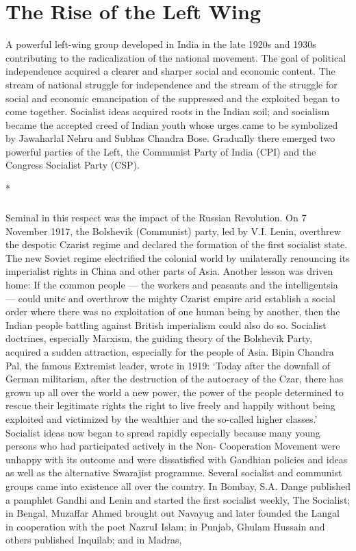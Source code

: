 \cleardoublepage
\chapter{The Rise of the Left Wing}



A powerful left-wing group developed in India in the late 1920s and 1930s contributing to the radicalization of the national movement. The goal of political independence acquired a clearer and sharper social and economic content. The stream of national struggle for independence and the stream of the struggle for social and economic emancipation of the suppressed and the exploited began to come together. Socialist ideas acquired roots in the Indian soil; and socialism became the accepted creed of Indian youth whose urges came to be symbolized by Jawaharlal Nehru and Subhas Chandra Bose. Gradually there emerged two powerful parties of the Left, the Communist Party of India (CPI) and the Congress Socialist Party (CSP).

\begin{center}*\end{center}

\paragraph*{}


Seminal in this respect was the impact of the Russian Revolution. On 7 November 1917, the Bolshevik (Communist) party, led by V.I. Lenin, overthrew the despotic Czarist regime and declared the formation of the first socialist state. The new Soviet regime electrified the colonial world by unilaterally renouncing its imperialist rights in China and other parts of Asia. Another lesson was driven home: If the common people — the workers and peasants and the intelligentsia — could unite and overthrow the mighty Czarist empire arid establish a social order where there was no exploitation of one human being by another, then the Indian people battling against British imperialism could also do so. Socialist doctrines, especially Marxism, the guiding theory of the Bolshevik Party, acquired a sudden attraction, especially for the people of Asia. Bipin Chandra Pal, the famous Extremist leader, wrote in 1919: `Today after the downfall of German militarism, after the destruction of the autocracy of the Czar, there has grown up all over the world a new power, the power of the people determined to rescue their legitimate rights the right to live freely and happily without being exploited and victimized by the wealthier and the so-called higher classes.' Socialist ideas now began to spread rapidly especially because many young persons who had participated actively in the Non- Cooperation Movement were unhappy with its outcome and were dissatisfied with Gandhian policies and ideas as well as the alternative Swarajist programme. Several socialist and communist groups came into existence all over the country. In Bombay, S.A. Dange published a pamphlet Gandhi and Lenin and started the first socialist weekly, The Socialist; in Bengal, Muzaffar Ahmed brought out Navayug and later founded the Langal in cooperation with the poet NazruI Islam; in Punjab, Ghulam Hussain and others published Inquilab; and in Madras, 


